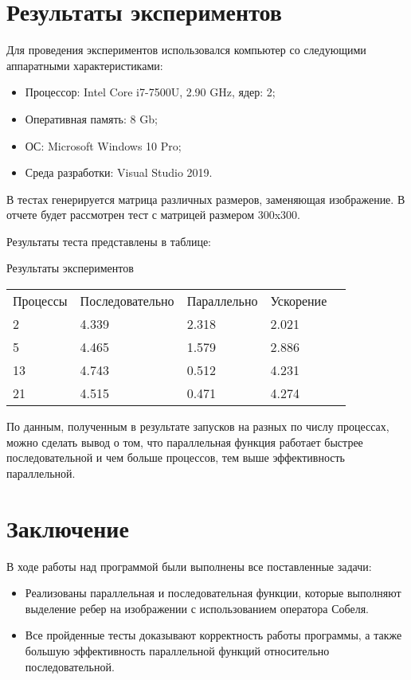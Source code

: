 \documentclass{report}
\begin{document}
	\section*{Результаты экспериментов}
	Для проведения экспериментов использовался компьютер со следующими аппаратными характеристиками:
	\begin{itemize}
		\item Процессор: Intel Core i7-7500U, 2.90 GHz, ядер: 2;
		\item Оперативная память: 8 Gb;
		\item ОС: Microsoft Windows 10 Pro;
		\item Среда разработки: Visual Studio 2019.
	\end{itemize}
	\par В тестах генерируется матрица различных размеров, заменяющая изображение. В отчете будет рассмотрен тест с матрицей размером 300x300.
	\par Результаты теста представлены в таблице:
	\begin{table}[!h]
		{Результаты экспериментов}
		\centering
		\begin{tabular}{lllll}
			Процессы & Последовательно & Параллельно & Ускорение  \\
			2        & 4.339           & 2.318       & 2.021      \\
			5        & 4.465           & 1.579       & 2.886      \\
			13       & 4.743           & 0.512       & 4.231      \\
			21       & 4.515           & 0.471       & 4.274      

		\end{tabular}
	\end{table}
	\par По данным, полученным в результате запусков на разных по числу процессах, можно сделать вывод о том, что параллельная функция работает быстрее последовательной и чем больше процессов, тем выше эффективность параллельной.
	\newpage

	\section*{Заключение}
	В ходе работы над программой были выполнены все поставленные задачи: \begin{itemize}
		 \item Реализованы параллельная и последовательная функции, которые выполняют выделение ребер на изображении с использованием оператора Собеля. 
		 \item Все пройденные тесты доказывают корректность работы программы, а также большую эффективность параллельной функций относительно последовательной.
	\end{itemize}
	\newpage
\end{document}

